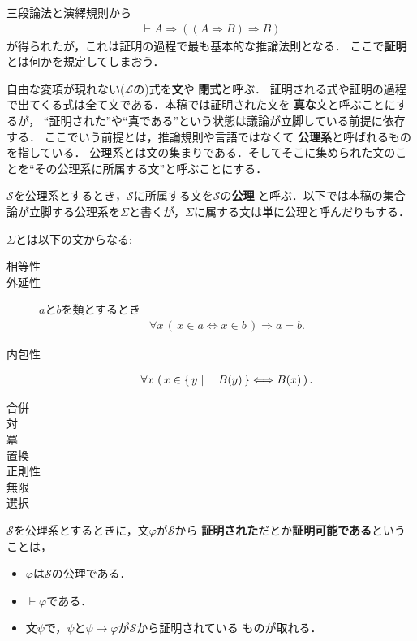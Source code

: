 	三段論法と演繹規則から
	\begin{align}
		\vdash A \Longrightarrow ((A \Longrightarrow B) \Longrightarrow B)
	\end{align}
	が得られたが，これは証明の過程で最も基本的な推論法則となる．
	ここで{\bf 証明}とは何かを規定してしまおう．
	
	自由な変項が現れない($\mathcal{L}$の)式を{\bf 文}や
	{\bf 閉式}と呼ぶ．
	証明される式や証明の過程で出てくる式は全て文である．本稿では証明された文を
	{\bf 真な}文と呼ぶことにするが，
	``証明された''や``真である''という状態は議論が立脚している前提に依存する．
	ここでいう前提とは，推論規則や言語ではなくて
	{\bf 公理系}と呼ばれるものを指している．
	公理系とは文の集まりである．そしてそこに集められた文のことを``その公理系に所属する文''と呼ぶことにする．
	
	$\mathscr{S}$を公理系とするとき，$\mathscr{S}$に所属する文を$\mathscr{S}$の{\bf 公理}
	と呼ぶ．以下では本稿の集合論が立脚する公理系を$\Sigma$と書くが，$\Sigma$に属する文は単に公理と呼んだりもする．
	
	$\Sigma$とは以下の文からなる:
	\begin{description}
		\item[相等性]
		\item[外延性] $a$と$b$を類とするとき
			\begin{align}
				\forall x\, (\, x \in a \Longleftrightarrow x \in b\, )
				\Longrightarrow a = b.
			\end{align}
			
		\item[内包性] 
			\begin{align}
				\forall x\, \left(\, x \in \left\{\, y \mid \quad B(y)\, \right\} \Longleftrightarrow B(x)\, \right).
			\end{align}
			
		\item[合併]
		\item[対]
		\item[冪]
		\item[置換]
		\item[正則性]
		\item[無限]
		\item[選択]
	\end{description}
	
	$\mathscr{S}$を公理系とするときに，文$\varphi$が$\mathscr{S}$から
	{\bf 証明された}だとか{\bf 証明可能である}ということは，
	\begin{itemize}
		\item $\varphi$は$\mathscr{S}$の公理である．
		\item $\vdash \varphi$である．
		\item 文$\psi$で，$\psi$と$\psi \rightarrow \varphi$が$\mathscr{S}$から証明されている
			ものが取れる．
	\end{itemize}
	
